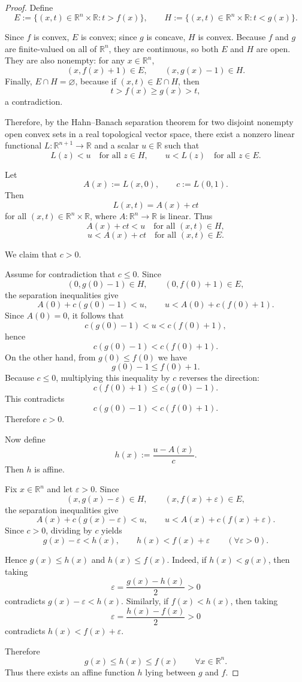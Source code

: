 \documentclass{article}
\begin{document}
\begin{proof}
Define
\[
E := \{(x,t)\in \mathbb R^n\times \mathbb R : t>f(x)\},
\qquad
H := \{(x,t)\in \mathbb R^n\times \mathbb R : t<g(x)\}.
\]

Since $f$ is convex, $E$ is convex; since $g$ is concave, $H$ is convex.
Because $f$ and $g$ are finite-valued on all of $\mathbb R^n$, they are continuous, so
both $E$ and $H$ are open.
They are also nonempty: for any $x\in\mathbb R^n$,
\[
(x,f(x)+1)\in E,
\qquad
(x,g(x)-1)\in H.
\]
Finally, $E\cap H=\varnothing$, because if $(x,t)\in E\cap H$, then
\[
t>f(x)\ge g(x)>t,
\]
a contradiction.

Therefore, by the Hahn--Banach separation theorem for two disjoint nonempty open convex
sets in a real topological vector space, there exist a nonzero linear functional
$L:\mathbb R^{n+1}\to\mathbb R$ and a scalar $u\in\mathbb R$ such that
\[
L(z)<u \quad \text{for all } z\in H,
\qquad
u<L(z) \quad \text{for all } z\in E.
\]

Let
\[
A(x):=L(x,0), \qquad c:=L(0,1).
\]
Then
\[
L(x,t)=A(x)+ct
\]
for all $(x,t)\in \mathbb R^n\times\mathbb R$, where $A:\mathbb R^n\to\mathbb R$ is linear. Thus
\[
A(x)+ct<u \quad \text{for all } (x,t)\in H,
\]
\[
u<A(x)+ct \quad \text{for all } (x,t)\in E.
\]

We claim that $c>0$.

Assume for contradiction that $c\le 0$.
Since
\[
(0,g(0)-1)\in H,
\qquad
(0,f(0)+1)\in E,
\]
the separation inequalities give
\[
A(0)+c(g(0)-1)<u,
\qquad
u<A(0)+c(f(0)+1).
\]
Since $A(0)=0$, it follows that
\[
c(g(0)-1)<u<c(f(0)+1),
\]
hence
\[
c(g(0)-1)<c(f(0)+1).
\]
On the other hand, from $g(0)\le f(0)$ we have
\[
g(0)-1\le f(0)+1.
\]
Because $c\le 0$, multiplying this inequality by $c$ reverses the direction:
\[
c(f(0)+1)\le c(g(0)-1).
\]
This contradicts
\[
c(g(0)-1)<c(f(0)+1).
\]
Therefore $c>0$.

Now define
\[
h(x):=\frac{u-A(x)}{c}.
\]
Then $h$ is affine.

Fix $x\in\mathbb R^n$ and let $\varepsilon>0$. Since
\[
(x,g(x)-\varepsilon)\in H,
\qquad
(x,f(x)+\varepsilon)\in E,
\]
the separation inequalities give
\[
A(x)+c(g(x)-\varepsilon)<u,
\qquad
u<A(x)+c(f(x)+\varepsilon).
\]
Since $c>0$, dividing by $c$ yields
\[
g(x)-\varepsilon < h(x),
\qquad
h(x)<f(x)+\varepsilon
\qquad (\forall \varepsilon>0).
\]

Hence $g(x)\le h(x)$ and $h(x)\le f(x)$. Indeed, if $h(x)<g(x)$, then taking
\[
\varepsilon=\frac{g(x)-h(x)}{2}>0
\]
contradicts $g(x)-\varepsilon<h(x)$. Similarly, if $f(x)<h(x)$, then taking
\[
\varepsilon=\frac{h(x)-f(x)}{2}>0
\]
contradicts $h(x)<f(x)+\varepsilon$.

Therefore
\[
g(x)\le h(x)\le f(x)\qquad \forall x\in\mathbb R^n.
\]
Thus there exists an affine function $h$ lying between $g$ and $f$.
\end{proof}
\end{document}
